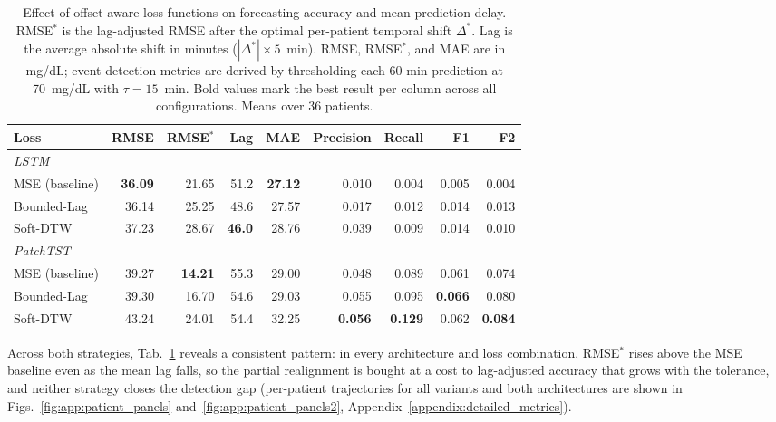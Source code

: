 \begin{table}[tbp]
\centering
\small
\caption{Effect of offset-aware loss functions on forecasting accuracy and mean prediction delay. RMSE$^*$ is the lag-adjusted RMSE after the optimal per-patient temporal shift $\Delta^*$. Lag is the average absolute shift in minutes ($|\Delta^*| \times 5$~min). RMSE, RMSE$^*$, and MAE are in mg/dL; event-detection metrics are derived by thresholding each 60-min prediction at 70~mg/dL with $\tau = 15$~min. Bold values mark the best result per column across all configurations. Means over 36 patients.}
\label{tab:exp:obj1}
\setlength{\tabcolsep}{3.5pt}
\begin{tabular}{lrrrrrrrr}
\toprule
Loss & RMSE & RMSE$^*$ & Lag & MAE & Precision & Recall & F1 & F2 \\
\midrule
\multicolumn{9}{l}{\textit{LSTM}} \\[2pt]
MSE (baseline) & \textbf{36.09} & 21.65          & 51.2          & \textbf{27.12} & 0.010 & 0.004 & 0.005 & 0.004 \\
Bounded-Lag    & 36.14          & 25.25          & 48.6          & 27.57          & 0.017 & 0.012 & 0.014 & 0.013 \\
Soft-DTW       & 37.23          & 28.67          & \textbf{46.0} & 28.76          & 0.039 & 0.009 & 0.014 & 0.010 \\
\midrule
\multicolumn{9}{l}{\textit{PatchTST}} \\[2pt]
MSE (baseline) & 39.27 & \textbf{14.21} & 55.3 & 29.00 & 0.048          & 0.089          & 0.061          & 0.074          \\
Bounded-Lag    & 39.30 & 16.70          & 54.6 & 29.03 & 0.055          & 0.095          & \textbf{0.066} & 0.080          \\
Soft-DTW       & 43.24 & 24.01          & 54.4 & 32.25 & \textbf{0.056} & \textbf{0.129} & 0.062          & \textbf{0.084} \\
\bottomrule
\end{tabular}
\end{table}

Across both strategies, Tab.~\ref{tab:exp:obj1} reveals a consistent pattern: in every architecture and loss combination, RMSE$^*$ rises above the MSE baseline even as the mean lag falls, so the partial realignment is bought at a cost to lag-adjusted accuracy that grows with the tolerance, and neither strategy closes the detection gap (per-patient trajectories for all variants and both architectures are shown in Figs.~\ref{fig:app:patient_panels} and~\ref{fig:app:patient_panels2}, Appendix~\ref{appendix:detailed_metrics}).

